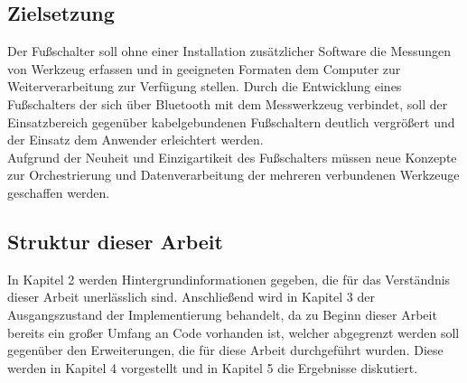 \subsection{Zielsetzung}
Der Fußschalter soll ohne einer Installation zusätzlicher Software die Messungen von Werkzeug erfassen und in geeigneten Formaten dem Computer zur Weiterverarbeitung zur Verfügung stellen. Durch die Entwicklung eines Fußschalters der sich über Bluetooth mit dem Messwerkzeug verbindet, soll der Einsatzbereich gegenüber kabelgebundenen Fußschaltern deutlich vergrößert und der Einsatz dem Anwender erleichtert werden.\\
Aufgrund der Neuheit und Einzigartikeit des Fußschalters müssen neue Konzepte zur Orchestrierung und Datenverarbeitung der mehreren verbundenen Werkzeuge geschaffen werden.

\subsection{Struktur dieser Arbeit}
In Kapitel 2 werden Hintergrundinformationen gegeben, die für das Verständnis dieser Arbeit unerlässlich sind. Anschließend wird in Kapitel 3 der Ausgangszustand der Implementierung behandelt, da zu Beginn dieser Arbeit bereits ein großer Umfang an Code vorhanden ist, welcher abgegrenzt werden soll gegenüber den Erweiterungen, die für diese Arbeit durchgeführt wurden. Diese werden in Kapitel 4 vorgestellt und in Kapitel 5 die Ergebnisse diskutiert.